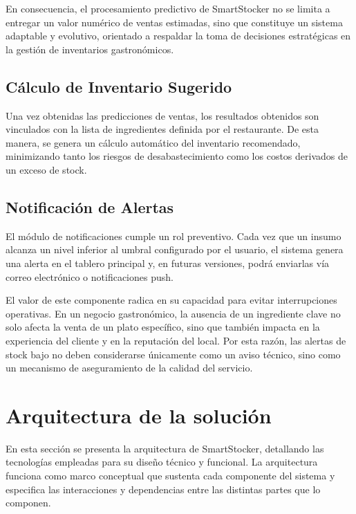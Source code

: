 En consecuencia, el procesamiento predictivo de SmartStocker no se limita a entregar un valor numérico de ventas estimadas, sino que constituye un sistema adaptable y evolutivo, orientado a respaldar la toma de decisiones estratégicas en la gestión de inventarios gastronómicos.

\subsection{Cálculo de Inventario Sugerido}\label{sec:calculo-inventario}

Una vez obtenidas las predicciones de ventas, los resultados obtenidos son vinculados con la lista de ingredientes definida por el restaurante. De esta manera, se genera un cálculo automático del inventario recomendado, minimizando tanto los riesgos de desabastecimiento como los costos derivados de un exceso de stock. 

\subsection{Notificación de Alertas}\label{sec:alertas}

El módulo de notificaciones cumple un rol preventivo. Cada vez que un insumo alcanza un nivel inferior al umbral configurado por el usuario, el sistema genera una alerta en el tablero principal y, en futuras versiones, podrá enviarlas vía correo electrónico o notificaciones push.

El valor de este componente radica en su capacidad para evitar interrupciones operativas. En un negocio gastronómico, la ausencia de un ingrediente clave no solo afecta la venta de un plato específico, sino que también impacta en la experiencia del cliente y en la reputación del local. Por esta razón, las alertas de stock bajo no deben considerarse únicamente como un aviso técnico, sino como un mecanismo de aseguramiento de la calidad del servicio.


\section{Arquitectura de la solución}\label{sec:arquitectura-solucion}
En esta sección se presenta la arquitectura de SmartStocker, detallando las tecnologías empleadas para su diseño técnico y funcional. La arquitectura funciona como marco conceptual que sustenta cada componente del sistema y especifica las interacciones y dependencias entre las distintas partes que lo componen.

